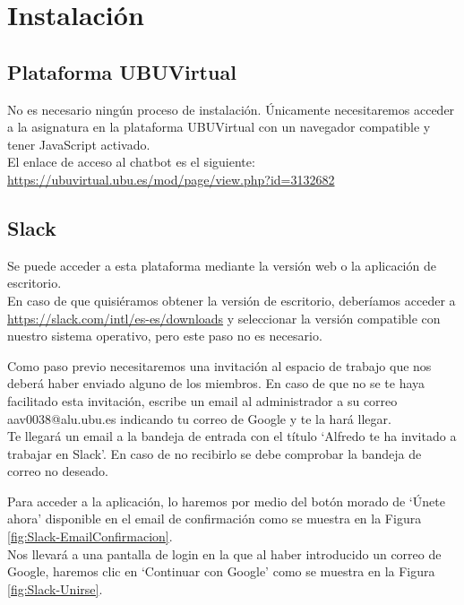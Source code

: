  \newpage
\section{Instalación}

\subsection{Plataforma UBUVirtual}

No es necesario ningún proceso de instalación. Únicamente necesitaremos acceder a la asignatura en la plataforma UBUVirtual con un navegador compatible y tener JavaScript activado.\\

El enlace de acceso al chatbot es el siguiente: \url{https://ubuvirtual.ubu.es/mod/page/view.php?id=3132682}

\subsection{Slack}

Se puede acceder a esta plataforma mediante la versión web o la aplicación de escritorio.\\
En caso de que quisiéramos obtener la versión de escritorio, deberíamos acceder a \url{https://slack.com/intl/es-es/downloads} y seleccionar la versión compatible con nuestro sistema operativo, pero este paso no es necesario.

Como paso previo necesitaremos una invitación al espacio de trabajo que nos deberá haber enviado alguno de los miembros. En caso de que no se te haya facilitado esta invitación, escribe un email al administrador a su correo  aav0038@alu.ubu.es indicando tu correo de Google y te la hará llegar. \\

Te llegará un email a la bandeja de entrada con el título `Alfredo te ha invitado a trabajar en Slack'. En caso de no recibirlo se debe comprobar la bandeja de correo no deseado. 


Para acceder a la aplicación, lo haremos por medio del botón morado de `Únete ahora' disponible en el email de confirmación como se muestra en la Figura \ref{fig:Slack-EmailConfirmacion}. \\
Nos llevará a una pantalla de login en la que al haber introducido un correo de Google, haremos clic en `Continuar con Google' como se muestra en la Figura \ref{fig:Slack-Unirse}.

